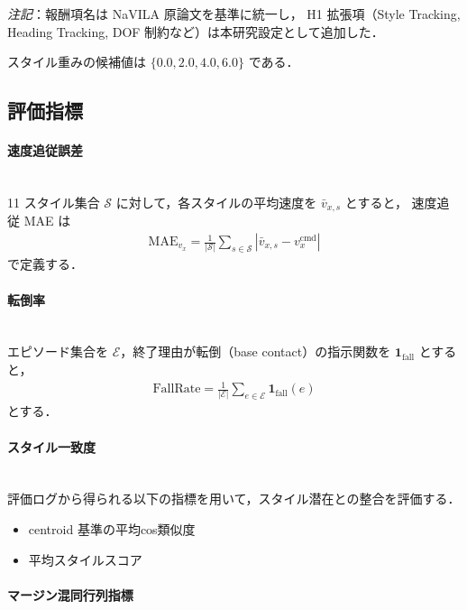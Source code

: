 \noindent\textit{注記}：報酬項名は NaVILA 原論文を基準に統一し，
H1 拡張項（Style Tracking, Heading Tracking, DOF 制約など）は本研究設定として追加した．

\noindent スタイル重みの候補値は $\{0.0, 2.0, 4.0, 6.0\}$ である．

\subsection{評価指標}
\label{subsec:rl_metrics}

\paragraph{速度追従誤差}\quad\\

11 スタイル集合 $\mathcal{S}$ に対して，各スタイルの平均速度を $\bar{v}_{x,s}$ とすると，
速度追従 MAE は
\begin{align}
  \mathrm{MAE}_{v_x}
  =\frac{1}{|\mathcal{S}|}\sum_{s\in\mathcal{S}}
  \left|\bar{v}_{x,s}-v_x^{\mathrm{cmd}}\right|
  \label{eq:rl_metric_velocity_mae}
\end{align}
で定義する．

\paragraph{転倒率}\quad\\

エピソード集合を $\mathcal{E}$，終了理由が転倒（base contact）の指示関数を $\mathbf{1}_{\mathrm{fall}}$ とすると，
\begin{align}
  \mathrm{FallRate}
  =\frac{1}{|\mathcal{E}|}\sum_{e\in\mathcal{E}}\mathbf{1}_{\mathrm{fall}}(e)
  \label{eq:rl_metric_fall_rate}
\end{align}
とする．

\paragraph{スタイル一致度}\quad\\

評価ログから得られる以下の指標を用いて，スタイル潜在との整合を評価する．
\begin{itemize}
  \item centroid 基準の平均cos類似度
  \item 平均スタイルスコア
\end{itemize}

\paragraph{マージン混同行列指標}\quad\\

